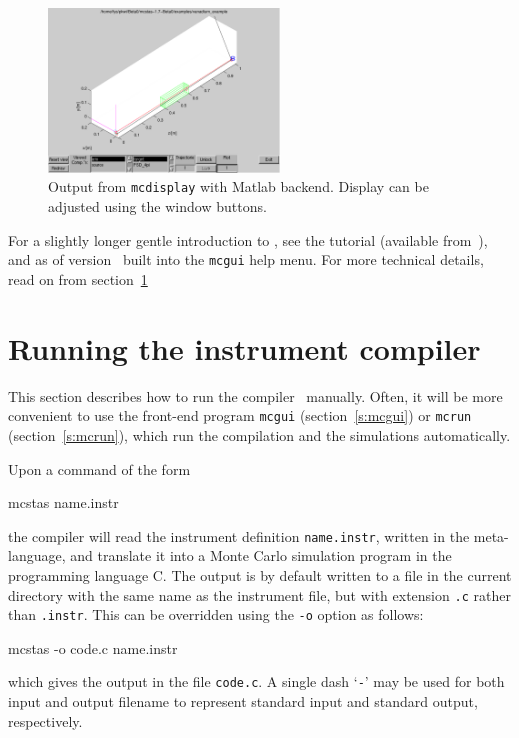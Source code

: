 \begin{figure}[htb!]
  \begin{center}
    \includegraphics[width=0.55\textwidth]{figures/mcdisplay_Matlab}
  \end{center}
  \caption{Output from \texttt{mcdisplay} with Matlab backend. Display can be
    adjusted using the window buttons.}
\label{fig:mcdisp_Matlab}
\end{figure}

For a slightly longer gentle introduction to \MCS, see the \MCS tutorial
(available from~\cite{mcstas_webpage}), and as of version \version\ built into
the \verb+mcgui+ help menu. For more technical details, read on from
section~\ref{s:running}



\section{Running the instrument compiler}
\label{s:running}

This section describes how to run the \MCS compiler \mcs\ manually. Often,
it will be more convenient to use the front-end program \verb+mcgui+
(section~\ref{s:mcgui}) or \verb+mcrun+ (section~\ref{s:mcrun}),
which run the compilation and the simulations automatically.

Upon a command of the form
\begin{bash}
    mcstas name.instr
\end{bash}
the compiler \mcs will read the instrument definition \verb+name.instr+,
written in the \MCS meta-language,
and translate it into a Monte Carlo simulation program in
the programming language C.
The output is by default written to a file in the current
directory with the same name as the instrument file, but with extension
\verb+.c+ rather than \verb+.instr+. This can be overridden using the
\verb+-o+ option as follows:
\begin{bash}
    mcstas -o code.c name.instr
\end{bash}
which gives the output in the file \verb+code.c+.
A single dash `\verb+-+' may be used for both input and output filename
to represent standard input and standard output, respectively.



